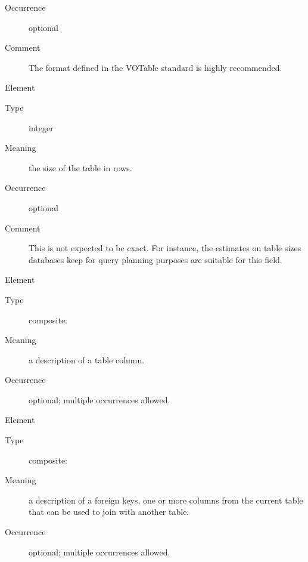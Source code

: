 \documentclass[11pt,a4paper]{ivoa}
\begin{document}
\begin{generated}
\begin{bigdescription}
\begin{description}
\item[Occurrence] optional
\item[Comment] 
                  The format defined in the VOTable standard is highly
                  recommended. 
               

\end{description}
\item[Element \xmlel{nrows}]
\begin{description}
\item[Type] integer
\item[Meaning] 
                  the size of the table in rows.
               
\item[Occurrence] optional
\item[Comment] 
                  This is not expected to be exact.  For instance, the
                  estimates on table sizes databases keep for query
                  planning purposes are suitable for this field.
               

\end{description}
\item[Element \xmlel{column}]
\begin{description}
\item[Type] composite: 
\item[Meaning] 
                  a description of a table column.
               
\item[Occurrence] optional; multiple occurrences allowed.

\end{description}
\item[Element \xmlel{foreignKey}]
\begin{description}
\item[Type] composite: 
\item[Meaning] 
                  a description of a foreign keys, one or more columns
                  from the current table that can be used to join with 
                  another table.  
               
\item[Occurrence] optional; multiple occurrences allowed.

\end{description}


\end{bigdescription}\endgroup

\endgroup
\end{generated}
\end{document}
